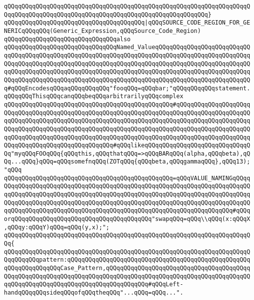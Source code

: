 \verb|qQQqqQQqqQQqqQQqqQQqqQQqqQQqqQQqqQQqqQQqqQQqqQQqqQQqqQQqqQQqqQQqqQQqqQQqqQQqqQQqqQQqqQQqqQQqqQQqqQQqqQQqqQQqqQQqqQQqqQQqqQQqqQQq}|\newline
\verb|qQQqqQQqqQQqqQQqqQQqqQQqqQQqqQQqqQQqqQQq|\verb#|qQQqSOURCE_CODE_REGION_FOR_GENERICqQQqqQQq(Generic_Expression,qQQqSource_Code_Region)#\newline
\newline
\newline
\newline
\verb|qQQqqQQqqQQqqQQqqQQqqQQqqQQqqQQqalso|\newline
\verb|qQQqqQQqqQQqqQQqqQQqqQQqqQQqqQQqNamed_ValueqQQqqQQqqQQqqQQqqQQqqQQqqQQqqQQqqQQqqQQqqQQqqQQqqQQqqQQqqQQqqQQqqQQqqQQqqQQqqQQqqQQqqQQqqQQqqQQqqQQqqQQqqQQqqQQqqQQqqQQqqQQqqQQqqQQqqQQqqQQqqQQqqQQqqQQqqQQqqQQqqQQqqQQqqQQqqQQqqQQqqQQqqQQqqQQqqQQqqQQqqQQqqQQqqQQqqQQqqQQqqQQqqQQqqQQqqQQqqQQqqQQqqQQqqQQqqQQqqQQqqQQqqQQqqQQqqQQqqQQqqQQqqQQqqQQqqQQqqQQqqQQqqQQq#qQQqEncodesqQQqaqQQqqQQqqQQq"fooqQQq=qQQqbar;"qQQqqQQqqQQqstatement.qQQqqQQqThisqQQqcanqQQqbeqQQqarbitrarilyqQQqcomplex|\newline
\verb|qQQqqQQqqQQqqQQqqQQqqQQqqQQqqQQqqQQqqQQqqQQqqQQq#qQQqqQQqqQQqqQQqqQQqqQQqqQQqqQQqqQQqqQQqqQQqqQQqqQQqqQQqqQQqqQQqqQQqqQQqqQQqqQQqqQQqqQQqqQQqqQQqqQQqqQQqqQQqqQQqqQQqqQQqqQQqqQQqqQQqqQQqqQQqqQQqqQQqqQQqqQQqqQQqqQQqqQQqqQQqqQQqqQQqqQQqqQQqqQQqqQQqqQQqqQQqqQQqqQQqqQQqqQQqqQQqqQQqqQQqqQQqqQQqqQQqqQQqqQQqqQQqqQQqqQQqqQQqqQQqqQQqqQQqqQQqqQQqqQQqqQQqqQQqqQQqqQQqqQQqqQQqqQQqqQQqqQQqqQQq#qQQqlikeqQQqqQQqqQQqqQQqqQQqqQQqqQQqqQQq"myqQQqFOOqQQq{qQQqthis,qQQqthatqQQq=>qQQqBARqQQq(alpha,qQQqbeta),qQQq...qQQq}qQQq=qQQqsomefnqQQq(ZOTqQQq{qQQqbeta,qQQqgammaqQQq},qQQq13);"qQQq|\newline
\verb|qQQqqQQqqQQqqQQqqQQqqQQqqQQqqQQqqQQqqQQqqQQqqQQq=qQQqVALUE_NAMINGqQQqqQQqqQQqqQQqqQQqqQQqqQQqqQQqqQQqqQQqqQQqqQQqqQQqqQQqqQQqqQQqqQQqqQQqqQQqqQQqqQQqqQQqqQQqqQQqqQQqqQQqqQQqqQQqqQQqqQQqqQQqqQQqqQQqqQQqqQQqqQQqqQQqqQQqqQQqqQQqqQQqqQQqqQQqqQQqqQQqqQQqqQQqqQQqqQQqqQQqqQQqqQQqqQQqqQQqqQQqqQQqqQQqqQQqqQQqqQQqqQQqqQQqqQQqqQQqqQQqqQQqqQQqqQQqqQQqqQQq#qQQqorqQQqqQQqqQQqqQQqqQQqqQQqqQQqqQQqqQQqqQQq"swapqQQq=qQQq\\qQQq(x:qQQqX,qQQqy:qQQqY)qQQq=qQQq(y,x);";|\newline
\verb|qQQqqQQqqQQqqQQqqQQqqQQqqQQqqQQqqQQqqQQqqQQqqQQqqQQqqQQqqQQqqQQqqQQqqQQq{|\newline
\verb|qQQqqQQqqQQqqQQqqQQqqQQqqQQqqQQqqQQqqQQqqQQqqQQqqQQqqQQqqQQqqQQqqQQqqQQqqQQqqQQqpattern:qQQqqQQqqQQqqQQqqQQqqQQqqQQqqQQqqQQqqQQqqQQqqQQqqQQqqQQqqQQqqQQqqQQqCase_Pattern,qQQqqQQqqQQqqQQqqQQqqQQqqQQqqQQqqQQqqQQqqQQqqQQqqQQqqQQqqQQqqQQqqQQqqQQqqQQqqQQqqQQqqQQqqQQqqQQqqQQqqQQqqQQqqQQqqQQqqQQqqQQqqQQqqQQqqQQqqQQqqQQqqQQqqQQq#qQQqLeft-handqQQqqQQqsideqQQqofqQQqtheqQQq"...qQQq=qQQq...".|\newline
